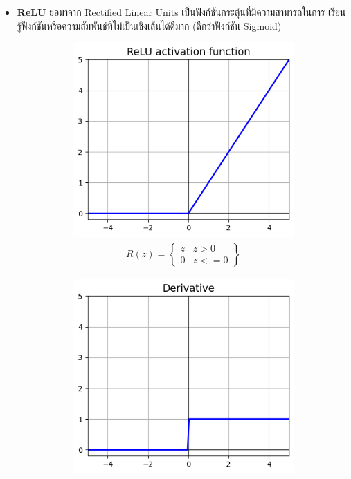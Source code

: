 \begin{itemize}
    \item \textbf{ReLU}\autocite{glorot2011} ย่อมาจาก Rectified Linear Units เป็นฟังก์ชันกระตุ้นที่มีความสามารถในการ%
    เรียนรู้ฟังก์ชันหรือความสัมพันธ์ที่ไม่เป็นเชิงเส้นได้ดีมาก (ดีกว่าฟังก์ชัน Sigmoid)
    \begin{figure}[H]
        \centering
        \begin{subfigure}{0.5\textwidth}
            \centering
            \includegraphics[width=0.9\linewidth]{fig/actfunc_relu.png}
            \caption{%
                \begin{equation}
                    \begin{split}R(z) = \begin{Bmatrix} z & z > 0 \\
                        0 & z <= 0 \end{Bmatrix}\end{split}
                \end{equation}
            }
            \label{fig:actfunc_relu}
        \end{subfigure}%
        \begin{subfigure}{0.5\textwidth}
            \centering
            \includegraphics[width=0.9\linewidth]{fig/actfunc_relu_der.png}

\end{subfigure}
\end{figure}
\end{itemize}
